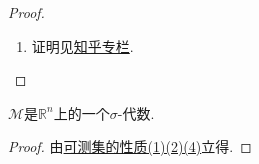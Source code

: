 \documentclass[../../main.tex]{subfiles}%
\begin{document}
\begin{proof}
\begin{enumerate}[(1)]
\item 证明见\href{https://zhuanlan.zhihu.com/p/365546947#:~:text=%E5%AE%9A%E7%90%864.1%20%EF%BC%88%E5%8F%AF%E6%B5%8B%E9%9B%86%E7%9A%84%E7%9B%B4%E7%A7%AF%E4%BB%8D%E7%84%B6%E5%8F%AF%E6%B5%8B%EF%BC%8C%E5%B9%B6%E4%B8%94%E7%9B%B4%E7%A7%AF%E7%9A%84%E6%B5%8B%E5%BA%A6%E4%B8%BA%E6%B5%8B%E5%BA%A6%E7%9A%84%E4%B9%98%E7%A7%AF%EF%BC%89%20%E5%A6%82%E6%9E%9C%20A%20%E5%92%8C%20B%20%E5%88%86%E5%88%AB%E4%B8%BA%20p,%28A%29%20cdot%20m%20%28B%29%5C%20%E8%AF%81%E6%98%8E%E6%8C%89%E7%85%A7%E4%BB%A5%E4%B8%8B%E7%89%B9%E6%AE%8A%E5%88%B0%E4%B8%80%E8%88%AC%E7%9A%84%E8%BF%87%E7%A8%8B%E3%80%82%20%E6%96%B9%E4%BD%93%EF%BC%9A%E6%96%B9%E4%BD%93%E7%9A%84%E7%9B%B4%E7%A7%AF%E4%BB%8D%E7%84%B6%E6%98%AF%E6%96%B9%E4%BD%93%EF%BC%8C%E6%89%80%E4%BB%A5%E5%8F%AF%E6%B5%8B%E3%80%82%20%E5%85%B6%E6%B5%8B%E5%BA%A6%E5%B0%B1%E6%98%AF%E5%8E%9F%E6%9D%A5%E4%B8%A4%E4%B8%AA%E6%96%B9%E4%BD%93%E7%9A%84%E4%B9%98%E7%A7%AF%E3%80%82%20%E6%A0%B9%E6%8D%AE%E6%B5%8B%E5%BA%A6%E7%9A%84%E5%8F%AF%E5%8A%A0%E6%80%A7%E5%BE%97%E5%88%B0%E7%9B%B4%E7%A7%AF%E7%9A%84%E6%B5%8B%E5%BA%A6%E7%AD%89%E4%BA%8E%E6%B5%8B%E5%BA%A6%E7%9A%84%E4%B9%98%E7%A7%AF%E3%80%82}{知乎专栏}.
\end{enumerate} 

\end{proof}

\begin{corollary}\label{corollary:可测集类是sigma-代数}
$\mathscr{M}$是$\mathbb{R}^n$上的一个$\sigma$-代数.
\end{corollary}
\begin{proof}

由\hyperref[theorem:可测集的性质]{可测集的性质(1)(2)(4)}立得.

\end{proof}
\end{document}
